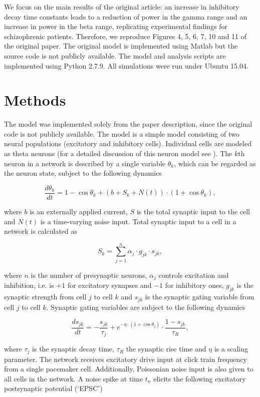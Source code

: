 \documentclass[10pt,a4paper,onecolumn]{article}
\begin{document}
We focus on the main results of the original article: an increase in
inhibitory decay time constants leads to a reduction of power in the
gamma range and an increase in power in the beta range, replicating
experimental findings for schizophrenic patients. Therefore, we
reproduce Figures 4, 5, 6, 7, 10 and 11 of the original paper. The original
model is implemented using Matlab but the source code is not publicly
available. The model and analysis scripts are implemented using Python
2.7.9. All simulations were run under Ubuntu 15.04.

\section{Methods}\label{methods}

The model was implemented solely from the paper description, since the
original code is not publicly available. The model is a simple model
consisting of two neural populations (excitatory and inhibitory cells).
Individual cells are modeled as theta neurons (for a detailed discussion
of this neuron model see \autocite{Boergers2003}). The $k$th neuron in a network is
described by a single variable \(\theta_k\), which can be regarded as the
neuron state, subject to the following dynamics

\[\frac{d \theta_k}{dt}=1-\cos \theta_k + (b+S_k+N(t))\cdot(1+ \cos \theta_k),\]

where \(b\) is an externally applied current, \(S\) is the total
synaptic input to the cell and \(N(t)\) is a time-varying noise input.
Total synaptic input to a cell in a network is calculated as

\[S_k = \sum_{j=1}^n \alpha_j \cdot g_{jk} \cdot s_{jk},\]

where \(n\) is the number of presynaptic neurons, \(\alpha _j\) controls excitation and inhibition, i.e. is $+1$ for excitatory synapses and $-1$ for inhibitory ones,
\(g_{jk}\)
is the synaptic strength from cell \(j\) to cell \(k\) and \(s_{jk}\) is
the synaptic gating variable from cell \(j\) to cell \(k\). Synaptic
gating variables are subject to the following dynamics

\[\frac{ds_{jk}}{dt}= - \frac{s _{jk}}{\tau _j} + e ^{- \eta \cdot (1+ \cos \theta _j)} \cdot \frac{1-s _{jk}}{\tau _R},\]

where \(\tau _j\) is the synaptic decay time, \(\tau_R\) the synaptic
rise time and \(\eta\) is a scaling parameter. The network receives excitatory drive input at click train
frequency from a single pacemaker cell. Additionally, Poissonian noise
input is also given to all cells in the network. A noise spike at time
\(t_n\) elicits the following excitatory postsynaptic potential (`EPSC')
\end{document}

